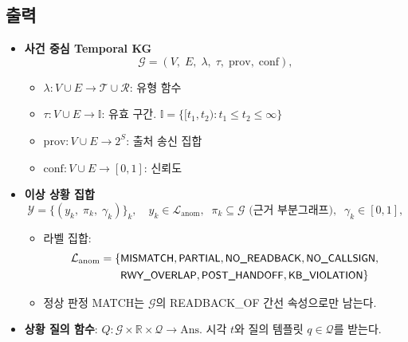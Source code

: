 \documentclass[10pt,a4paper]{article}
\newcommand{\G}{\mathcal{G}}
\newcommand{\Yset}{\mathcal{Y}}
\newcommand{\Ivl}{\mathbb{I}}
\newcommand{\cmd}[1]{\textsf{\small #1}}
\begin{document}
\subsection{출력}
\begin{itemize}
\item \textbf{사건 중심 Temporal KG}
\begin{equation}
\G = (V,\; E,\; \lambda,\; \tau,\; \mathrm{prov},\; \mathrm{conf}),
\end{equation}
  \begin{itemize}
  \item $\lambda: V \cup E \to \mathcal{T}\cup\mathcal{R}$: 유형 함수
  \item $\tau: V\cup E \to \Ivl$: 유효 구간. $\Ivl = \{[t_1,t_2) : t_1 \le t_2 \le \infty\}$
  \item $\mathrm{prov}: V\cup E \to 2^{S}$: 출처 송신 집합
  \item $\mathrm{conf}: V\cup E \to [0,1]$: 신뢰도
  \end{itemize}
\item \textbf{이상 상황 집합}
\begin{equation}
\Yset = \{(y_k,\; \pi_k,\; \gamma_k)\}_{k}, \quad y_k \in \mathcal{L}_{\mathrm{anom}},\;\; \pi_k \subseteq \G \text{ (근거 부분그래프)},\;\; \gamma_k\in[0,1],
\end{equation}
  \begin{itemize}
  \item 라벨 집합:
  \begin{align*}\mathcal{L}_{\mathrm{anom}} = \{&\cmd{MISMATCH},\cmd{PARTIAL},\cmd{NO\_READBACK},\cmd{NO\_CALLSIGN},\\ &\cmd{RWY\_OVERLAP},\cmd{POST\_HANDOFF},\cmd{KB\_VIOLATION}\}\end{align*}
  \item 정상 판정 \cmd{MATCH}는 $\G$의 \cmd{READBACK\_OF} 간선 속성으로만 남는다.
  \end{itemize}
\item \textbf{상황 질의 함수}: $Q: \G \times \mathbb{R} \times \mathcal{Q} \to \mathrm{Ans}$. 시각 $t$와 질의 템플릿 $q\in\mathcal{Q}$를 받는다.
\end{itemize}
\end{document}
